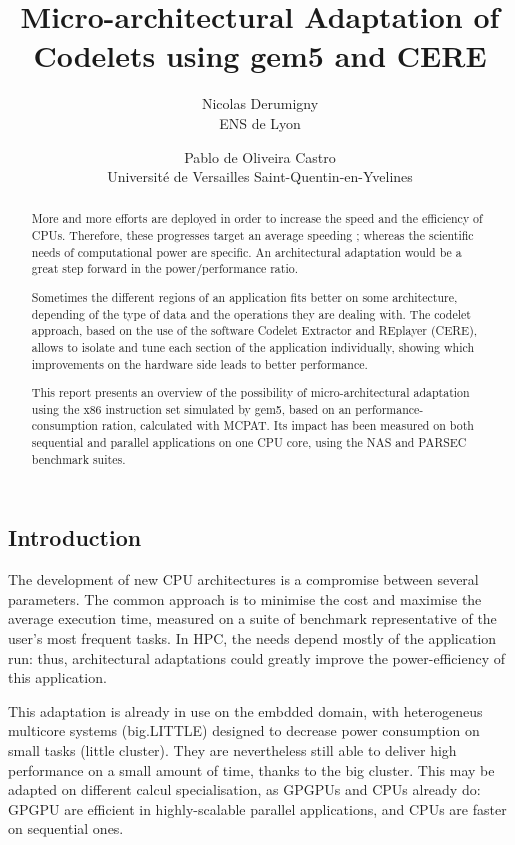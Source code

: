 \documentclass{article}
\title{Micro-architectural Adaptation of Codelets using gem5 and CERE}
\author{Nicolas Derumigny \\
\small ENS de Lyon 
\and Pablo de Oliveira Castro\\ 
\small Université de Versailles Saint-Quentin-en-Yvelines}
\date{}
\begin{document}
\maketitle

\smallskip

\begin{multicols}{2}

\begin{abstract}
More and more efforts are deployed in order to increase the speed and the efficiency of CPUs. Therefore, these progresses target an average speeding ; whereas the scientific needs of computational power are specific. An architectural adaptation would be a great step forward in the power/performance ratio.


Sometimes the different regions of an application fits better on some architecture, depending of the type of data and the operations they are dealing with. The codelet approach, based on the use of the software Codelet Extractor and REplayer (CERE), allows to isolate and tune each section of the application individually, showing which improvements on the hardware side leads to better performance.


This report presents an overview of the possibility of micro-architectural adaptation using the x86 instruction set simulated by gem5, based on an performance-consumption ration, calculated with MCPAT.
 Its impact has been measured on both sequential and parallel applications on one CPU core, using the NAS and PARSEC benchmark suites. 

\end{abstract}


\section{Introduction}
The development of new CPU architectures is a compromise between several parameters. The common approach is to minimise the cost and maximise the average execution time, measured on a suite of benchmark representative of the user's most frequent tasks. In HPC,%
the needs depend mostly of the application run: thus, architectural adaptations could greatly improve the power-efficiency of this application.


This adaptation is already in use on the embdded domain, with heterogeneus multicore systems (big.LITTLE) designed to decrease power consumption on small tasks (little cluster). They are nevertheless still able to deliver high performance on a small amount of time, thanks to the big cluster. This may be adapted on different calcul specialisation, as GPGPUs and CPUs already do: GPGPU are efficient in highly-scalable parallel applications, and CPUs are faster on sequential ones.


\end{multicols}
\end{document}
